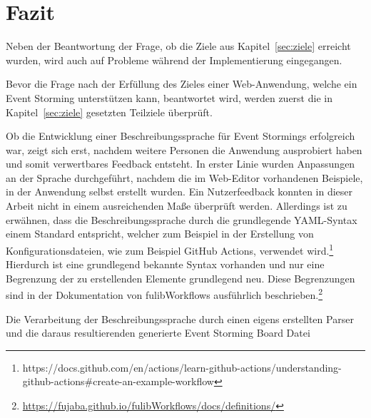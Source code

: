 \chapter{Fazit}\label{ch:fazit}
Neben der Beantwortung der Frage, ob die Ziele aus Kapitel~\ref{sec:ziele} erreicht wurden, wird auch auf Probleme während
der Implementierung eingegangen.

Bevor die Frage nach der Erfüllung des Zieles einer Web-Anwendung, welche ein Event Storming unterstützen kann, beantwortet wird,
werden zuerst die in Kapitel~\ref{sec:ziele} gesetzten Teilziele überprüft.

Ob die Entwicklung einer Beschreibungssprache für Event Stormings erfolgreich war, zeigt sich erst, nachdem weitere Personen die Anwendung 
ausprobiert haben und somit verwertbares Feedback entsteht.
In erster Linie wurden Anpassungen an der Sprache durchgeführt, nachdem die im Web-Editor vorhandenen Beispiele, in der Anwendung selbst erstellt wurden.
Ein Nutzerfeedback konnten in dieser Arbeit nicht in einem ausreichenden Maße überprüft werden.
Allerdings ist zu erwähnen, dass die Beschreibungssprache durch die grundlegende YAML-Syntax einem Standard entspricht, welcher zum Beispiel in der Erstellung
von Konfigurationsdateien, wie zum Beispiel GitHub Actions, verwendet wird.\footnote{https://docs.github.com/en/actions/learn-github-actions/understanding-github-actions#create-an-example-workflow}
Hierdurch ist eine grundlegend bekannte Syntax vorhanden und nur eine Begrenzung der zu erstellenden Elemente grundlegend neu.
Diese Begrenzungen sind in der Dokumentation von fulibWorkflows ausführlich beschrieben.\footnote{\url{https://fujaba.github.io/fulibWorkflows/docs/definitions/}}

Die Verarbeitung der Beschreibungssprache durch einen eigens erstellten Parser und die daraus resultierenden generierte Event Storming Board Datei





